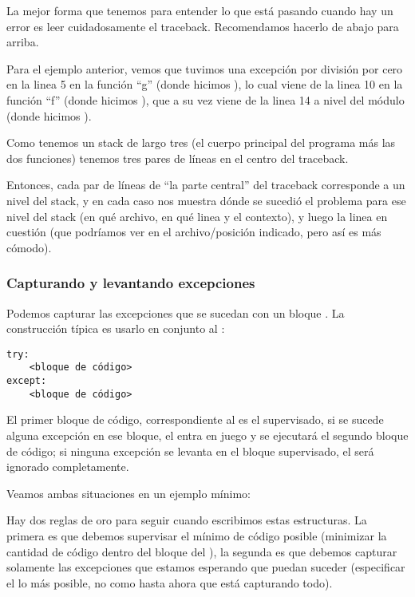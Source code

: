 La mejor forma que tenemos para entender lo que está pasando cuando hay un error es leer cuidadosamente el traceback. Recomendamos hacerlo de abajo para arriba. 

Para el ejemplo anterior, vemos que tuvimos una excepción por división por cero en la linea 5 en la función ``g'' (donde hicimos ), lo cual viene de la linea 10 en la función ``f'' (donde hicimos ), que a su vez viene de la linea 14 a nivel del módulo (donde hicimos ).

Como tenemos un stack de largo tres (el cuerpo principal del programa más las dos funciones) tenemos tres pares de líneas en el centro del traceback. 

Entonces, cada par de líneas de ``la parte central'' del traceback corresponde a un nivel del stack, y en cada caso nos muestra dónde se sucedió el problema para ese nivel del stack (en qué archivo, en qué linea y el contexto), y luego la linea en cuestión (que podríamos ver en el archivo/posición indicado, pero así es más cómodo).

\subsubsection{Capturando y levantando excepciones} 

Podemos capturar las excepciones que se sucedan con un bloque . La construcción típica es usarlo en conjunto al :

\begin{verbatim}
try:
    <bloque de código>
except:
    <bloque de código>
\end{verbatim}

El primer bloque de código, correspondiente al  es el supervisado, si se sucede alguna excepción en ese bloque, el  entra en juego y se ejecutará el segundo bloque de código; si ninguna excepción se levanta en el bloque supervisado, el  será ignorado completamente.

Veamos ambas situaciones en un ejemplo mínimo:


Hay dos reglas de oro para seguir cuando escribimos estas estructuras. La primera es que debemos supervisar el mínimo de código posible (minimizar la cantidad de código dentro del bloque del ), la segunda es que debemos capturar solamente las excepciones que estamos esperando que puedan suceder (especificar el  lo más posible, no como hasta ahora que está capturando todo).

